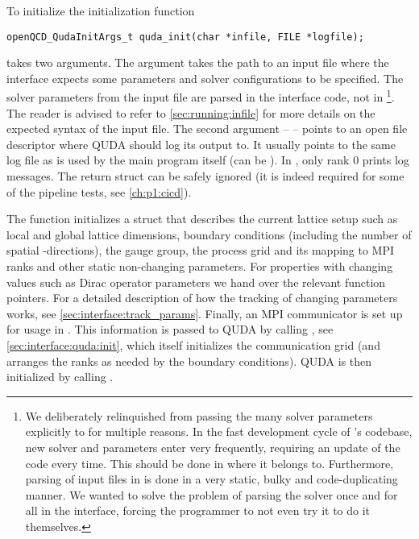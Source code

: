 To initialize \quda the initialization function
\begin{verbatim}
openQCD_QudaInitArgs_t quda_init(char *infile, FILE *logfile);
\end{verbatim}
takes two arguments.
The  argument takes the path to an input file where the interface expects some parameters and solver configurations to be specified.
The solver parameters from the input file are parsed in the interface code, not in \openqxd\footnote{We deliberately relinquished from passing the many solver parameters explicitly to \quda for multiple reasons. In the fast development cycle of \quda's codebase, new solver and parameters enter very frequently, requiring an update of the code every time. This should be done in \quda where it belongs to. Furthermore, parsing of input files in \openqxd is done in a very static, bulky and code-duplicating manner. We wanted to solve the problem of parsing the solver once and for all in the interface, forcing the programmer to not even try it to do it themselves.}.
The reader is advised to refer to \cref{sec:running:infile} for more details on the expected syntax of the input file.
The second argument --  -- points to an open file descriptor where QUDA should log its output to.
It usually points to the same log file as is used by the main program itself (can be ).
In \quda, only rank \num{0} prints log messages.
The return struct can be safely ignored (it is indeed required for some of the pipeline tests, see \cref{ch:p1:cicd}).

The function initializes a struct that describes the current lattice setup such as
  local and global lattice dimensions,
  boundary conditions (including the number of spatial \Cstar-directions),
  the gauge group,
  the process grid and its mapping to MPI ranks
  and other static non-changing parameters.
For properties with changing values such as Dirac operator parameters we hand over the relevant function pointers.
For a detailed description of how the tracking of changing parameters works, see \cref{sec:interface:track_params}.
Finally, an MPI communicator is set up for usage in \quda.
This information is passed to QUDA by calling , see \cref{sec:interface:quda:init}, which itself initializes the communication grid (and arranges the ranks as needed by the boundary conditions). QUDA is then initialized by calling .

